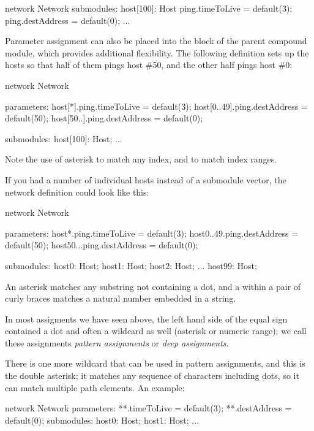 \begin{ned}
network Network
{
    submodules:
        host[100]: Host {
            ping.timeToLive = default(3);
            ping.destAddress = default(0);
        }
        ...
}
\end{ned}

Parameter assignment can also be placed into the  block of
the parent compound module, which provides additional flexibility. The
following definition sets up the hosts so that half of them pings host \#50,
and the other half pings host \#0:

\begin{ned}
network Network
{
    parameters:
        host[*].ping.timeToLive = default(3);
        host[0..49].ping.destAddress = default(50);
        host[50..].ping.destAddress = default(0);

    submodules:
        host[100]: Host;
        ...
}
\end{ned}

Note the use of asterisk to match any index, and  to match index ranges.

If you had a number of individual hosts instead of a submodule vector,
the network definition could look like this:

\begin{ned}
network Network
{
    parameters:
        host*.ping.timeToLive = default(3);
        host{0..49}.ping.destAddress = default(50);
        host{50..}.ping.destAddress = default(0);

    submodules:
        host0: Host;
        host1: Host;
        host2: Host;
        ...
        host99: Host;
}
\end{ned}

An asterisk matches any substring not containing a dot, and a 
within a pair of curly braces matches a natural number embedded in a
string.

In most assigments we have seen above, the left hand side of the equal sign
contained a dot and often a wildcard as well (asterisk or numeric range);
we call these assignments \textit{pattern assignments} or \textit{deep
assignments}.

There is one more wildcard that can be used in pattern assignments, and
this is the double asterisk; it matches any sequence of characters
including dots, so it can match multiple path elements. An example:

\begin{ned}
network Network
{
    parameters:
        **.timeToLive = default(3);
        **.destAddress = default(0);
    submodules:
        host0: Host;
        host1: Host;
        ...
}
\end{ned}

